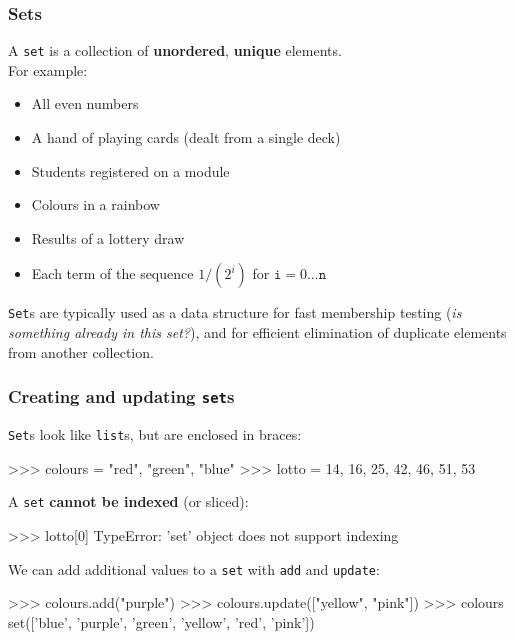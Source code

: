 \documentclass{beamer}
\begin{document}
\begin{frame}[fragile]
\frametitle{Sets}
    A \texttt{set} is a collection of \textbf{unordered}, \textbf{unique} elements.\\
    For example:

    \begin{itemize}
        \item All even numbers
        \item A hand of playing cards (dealt from a single deck)
        \item Students registered on a module
        \item Colours in a rainbow
        \item Results of a lottery draw
        \item Each term of the sequence $1/(2^i)$ for $\texttt{i}=0...\texttt{n}$
    \end{itemize}

    \texttt{Set}s are typically used as a data structure for fast 
    membership testing (\textit{is something already in this set?}), and for
    efficient elimination of duplicate elements from another collection.
\end{frame}


\begin{frame}[fragile]
\frametitle{Creating and updating \texttt{set}s}
\texttt{Set}s look like \texttt{list}s, but are enclosed in braces:
\begin{code}
>>> colours = {"red", "green", "blue"}
>>> lotto = {14, 16, 25, 42, 46, 51, 53}
\end{code}

\vskip 0.2cm
A \texttt{set} \textbf{cannot be indexed} (or sliced):
\begin{code}
>>> lotto[0]
TypeError: 'set' object does not support indexing
\end{code}

\vskip 0.2cm
    We can add additional values to a \texttt{set} with \texttt{add} and \texttt{update}:
\begin{code}
>>> colours.add("purple")
>>> colours.update(["yellow", "pink"])
>>> colours
set(['blue', 'purple', 'green', 'yellow', 'red', 'pink'])
\end{code}
\end{frame}
\end{document}
